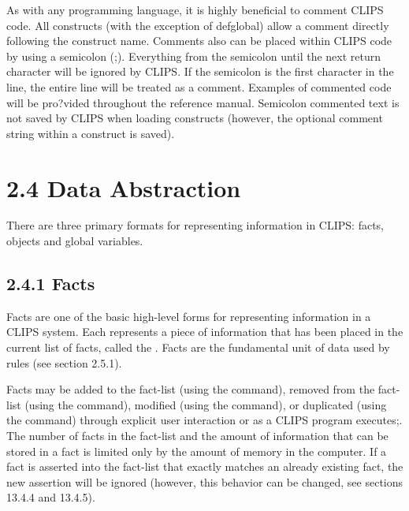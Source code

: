 \documentclass[letterpaper,10pt,english]{sphinxmanual}
\begin{document}
As with any programming language, it is highly beneficial to comment
CLIPS code. All constructs (with the exception of defglobal) allow a
comment directly following the construct name. Comments also can be
placed within CLIPS code by using a semicolon (;). Everything from the
semicolon until the next return character will be ignored by CLIPS. If
the semicolon is the first character in the line, the entire line will
be treated as a comment. Examples of commented code will be pro?vided
throughout the reference manual. Semicolon commented text is not saved
by CLIPS when loading constructs (however, the optional comment string
within a construct is saved).


\section{2.4 Data Abstraction}
\label{\detokenize{overview:data-abstraction}}
There are three primary formats for representing information in CLIPS:
facts, objects and global variables.


\subsection{2.4.1 Facts}
\label{\detokenize{overview:facts}}
Facts are one of the basic high-level forms for representing information
in a CLIPS system. Each  represents a piece of information that
has been placed in the current list of facts, called the .
Facts are the fundamental unit of data used by rules (see section
2.5.1).

Facts may be added to the fact-list (using the  command),
removed from the fact-list (using the  command), modified
(using the  command), or duplicated (using the 
command) through explicit user interaction or as a CLIPS program
executes;. The number of facts in the fact-list and the amount of
information that can be stored in a fact is limited only by the amount
of memory in the computer. If a fact is asserted into the fact-list that
exactly matches an already existing fact, the new assertion will be
ignored (however, this behavior can be changed, see sections 13.4.4 and
13.4.5).
\end{document}
